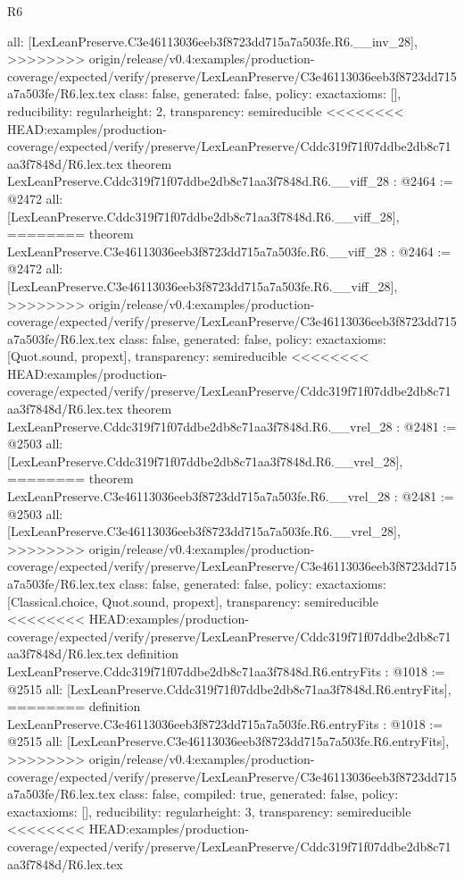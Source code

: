 \begin{lexlean}{R6}
\begin{coremodule}
{{{{{{{{{{{{  all: [LexLeanPreserve.C3e46113036eeb3f8723dd715a7a503fe.R6.__inv_28],
>>>>>>>> origin/release/v0.4:examples/production-coverage/expected/verify/preserve/LexLeanPreserve/C3e46113036eeb3f8723dd715a7a503fe/R6.lex.tex
  class: false,
  generated: false,
  policy: exact{axioms: []},
  reducibility: regular{height: 2},
  transparency: semireducible
}
<<<<<<<< HEAD:examples/production-coverage/expected/verify/preserve/LexLeanPreserve/Cddc319f71f07ddbe2db8c71aa3f7848d/R6.lex.tex
theorem LexLeanPreserve.Cddc319f71f07ddbe2db8c71aa3f7848d.R6.__viff_28 : @2464 := @2472 {
  all: [LexLeanPreserve.Cddc319f71f07ddbe2db8c71aa3f7848d.R6.__viff_28],
========
theorem LexLeanPreserve.C3e46113036eeb3f8723dd715a7a503fe.R6.__viff_28 : @2464 := @2472 {
  all: [LexLeanPreserve.C3e46113036eeb3f8723dd715a7a503fe.R6.__viff_28],
>>>>>>>> origin/release/v0.4:examples/production-coverage/expected/verify/preserve/LexLeanPreserve/C3e46113036eeb3f8723dd715a7a503fe/R6.lex.tex
  class: false,
  generated: false,
  policy: exact{axioms: [Quot.sound, propext]},
  transparency: semireducible
}
<<<<<<<< HEAD:examples/production-coverage/expected/verify/preserve/LexLeanPreserve/Cddc319f71f07ddbe2db8c71aa3f7848d/R6.lex.tex
theorem LexLeanPreserve.Cddc319f71f07ddbe2db8c71aa3f7848d.R6.__vrel_28 : @2481 := @2503 {
  all: [LexLeanPreserve.Cddc319f71f07ddbe2db8c71aa3f7848d.R6.__vrel_28],
========
theorem LexLeanPreserve.C3e46113036eeb3f8723dd715a7a503fe.R6.__vrel_28 : @2481 := @2503 {
  all: [LexLeanPreserve.C3e46113036eeb3f8723dd715a7a503fe.R6.__vrel_28],
>>>>>>>> origin/release/v0.4:examples/production-coverage/expected/verify/preserve/LexLeanPreserve/C3e46113036eeb3f8723dd715a7a503fe/R6.lex.tex
  class: false,
  generated: false,
  policy: exact{axioms: [Classical.choice, Quot.sound, propext]},
  transparency: semireducible
}
<<<<<<<< HEAD:examples/production-coverage/expected/verify/preserve/LexLeanPreserve/Cddc319f71f07ddbe2db8c71aa3f7848d/R6.lex.tex
definition LexLeanPreserve.Cddc319f71f07ddbe2db8c71aa3f7848d.R6.entryFits : @1018 := @2515 {
  all: [LexLeanPreserve.Cddc319f71f07ddbe2db8c71aa3f7848d.R6.entryFits],
========
definition LexLeanPreserve.C3e46113036eeb3f8723dd715a7a503fe.R6.entryFits : @1018 := @2515 {
  all: [LexLeanPreserve.C3e46113036eeb3f8723dd715a7a503fe.R6.entryFits],
>>>>>>>> origin/release/v0.4:examples/production-coverage/expected/verify/preserve/LexLeanPreserve/C3e46113036eeb3f8723dd715a7a503fe/R6.lex.tex
  class: false,
  compiled: true,
  generated: false,
  policy: exact{axioms: []},
  reducibility: regular{height: 3},
  transparency: semireducible
}
<<<<<<<< HEAD:examples/production-coverage/expected/verify/preserve/LexLeanPreserve/Cddc319f71f07ddbe2db8c71aa3f7848d/R6.lex.tex
}}}}}}}}}}}}}}
\end{coremodule}
\end{lexlean}

